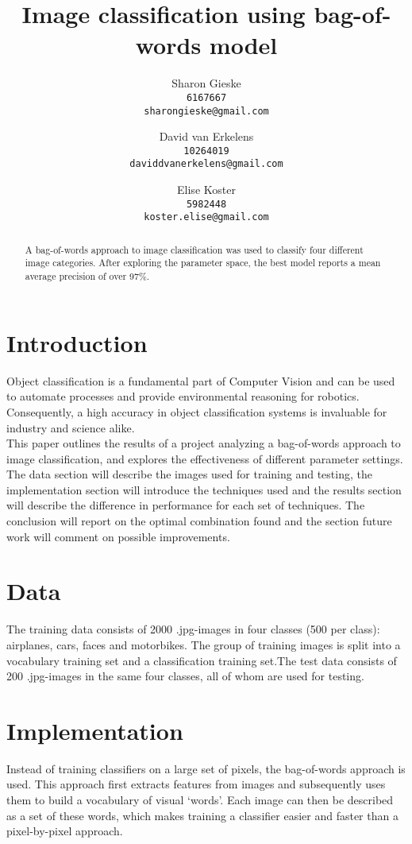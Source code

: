 \documentclass{article} %
\title{Image classification using bag-of-words model}
\author{
Sharon Gieske \\
\texttt{6167667}\\
\texttt{sharongieske@gmail.com} \\
\and
David van Erkelens\\
\texttt{10264019}\\
\texttt{daviddvanerkelens@gmail.com} \\
\and
Elise Koster \\
\texttt{5982448}\\
\texttt{koster.elise@gmail.com}
}
\begin{document}
\maketitle

\begin{abstract}
A bag-of-words approach to image classification was used  to classify four different image categories. After exploring the parameter space, the best model reports a mean average precision of over 97\%.
\end{abstract}


\section{Introduction}
Object classification is a fundamental part of Computer Vision and can be used to automate processes and provide environmental reasoning for robotics. Consequently, a high accuracy in object classification systems is invaluable for industry and science alike.\\
This paper outlines the results of a project analyzing a bag-of-words approach to image classification, and explores the effectiveness of different parameter settings.\\
The data section will describe the images used for training and testing, the implementation section will introduce the techniques used and the results section will describe the difference in performance for each set of techniques. The conclusion will report on the optimal combination found and the section future work will comment on possible improvements.

\section{Data}
The training data consists of 2000 .jpg-images in four classes (500 per class): airplanes, cars, faces and motorbikes. The group of training images is split into a vocabulary training set and a classification training set.The test data consists of 200 .jpg-images in the same four classes, all of whom are used for testing.

\section{Implementation}
Instead of training classifiers on a large set of pixels, the bag-of-words approach is used. This approach first extracts features from images and subsequently uses them to build a vocabulary of visual `words'. Each image can then be described as a set of these words, which makes training a classifier easier and faster than a pixel-by-pixel approach. \\
\end{document}
